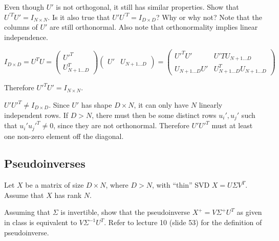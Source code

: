 \problem[4] Even though $U'$ is not orthogonal, it still has similar properties. Show that $U^{'T} U' = I_{N \times N}$. Is it also true that $U' U^{'T} = I_{D \times D}$? Why or why not? Note that the columns of $U'$ are still orthonormal. Also note that orthonormality implies linear independence.

\begin{solution}
	$$
	I_{D \times D} =
	U^T U =
	\begin{pmatrix}
		U'^T \\
		U_{N+1 \dots D}^T
	\end{pmatrix}
	\begin{pmatrix}
		U' & U_{N+1 \dots D}
	\end{pmatrix} =
	\begin{pmatrix}
		U'^T U' & U'T U_{N+1 \dots D} \\
		U_{N+1 \dots D} U' & U_{N+1 \dots D}^T U_{N+1 \dots D}
	\end{pmatrix}
	$$

	Therefore $U'^T U' = I_{N \times N}$.

	$U' U'^T \neq I_{D \times D}$.
	Since $U'$ has shape $D \times N$, it can only have $N$ linearly independent rows.
	If $D > N$, there must then be some distinct rows $u_i', u_j'$ such that $u_i' u_j'^T \neq 0$, since they are not orthonormal.
	Therefore $U' U'^T$ must at least one non-zero element off the diagonal.
\end{solution}

\newpage
\subsection{Pseudoinverses} Let $X$ be a matrix of size $D \times N$, where $D > N$, with ``thin'' SVD $X = U\Sigma V^T$. Assume that $X$ has rank $N$.

\problem[4] Assuming that $\Sigma$ is invertible, show that the pseudoinverse $X^+ = V\Sigma^+ U^T$ as given in class is equivalent to $V\Sigma^{-1} U^T$. Refer to lecture 10 (slide 53) for the definition of pseudoinverse.


